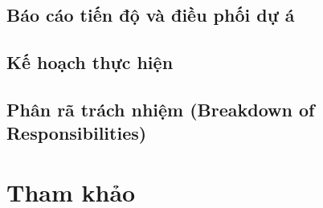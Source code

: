 \documentclass[a4paper, 12pt]{article}
\begin{document}
\subsection{Báo cáo tiến độ và điều phối dự á}

\subsection{Kế hoạch thực hiện}

\subsection{Phân rã trách nhiệm (Breakdown of Responsibilities)}

\clearpage

\section{Tham khảo}
\clearpage
\end{document}
